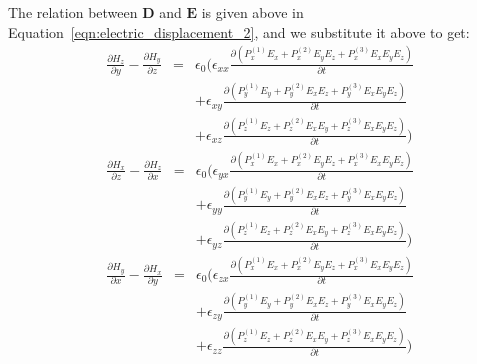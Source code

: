 \documentclass{article}[12pt]
\theoremstyle{plain}
\begin{document}
The relation between $\mathbf{D}$ and $\mathbf{E}$ is given above in
Equation~\ref{eqn:electric_displacement_2}, and we substitute it above to get:
\begin{eqnarray}
\frac{\partial H_z}{\partial y} - \frac{\partial H_y}{\partial z} & = & \epsilon_0 \Big( \epsilon_{xx} \frac{\partial (P^{(1)}_xE_x+P^{(2)}_xE_yE_z+P^{(3)}_xE_xE_yE_z)}{\partial t}  \nonumber \\
& & + \epsilon_{xy} \frac{\partial (P^{(1)}_yE_y+P^{(2)}_yE_xE_z+P^{(3)}_yE_xE_yE_z)}{\partial t}  \nonumber \\
& & + \epsilon_{xz} \frac{\partial (P^{(1)}_zE_z+P^{(2)}_zE_xE_y+P^{(3)}_zE_xE_yE_z)}{\partial t}  \Big) 
\end{eqnarray}
\begin{eqnarray}
\frac{\partial H_x}{\partial z} - \frac{\partial H_z}{\partial x} & = & \epsilon_0 \Big( \epsilon_{yx} \frac{\partial (P^{(1)}_xE_x+P^{(2)}_xE_yE_z+P^{(3)}_xE_xE_yE_z)}{\partial t}  \nonumber \\
& & + \epsilon_{yy} \frac{\partial (P^{(1)}_yE_y+P^{(2)}_yE_xE_z+P^{(3)}_yE_xE_yE_z)}{\partial t}  \nonumber \\
& & + \epsilon_{yz} \frac{\partial (P^{(1)}_zE_z+P^{(2)}_zE_xE_y+P^{(3)}_zE_xE_yE_z)}{\partial t}  \Big) 
\end{eqnarray}
\begin{eqnarray}
\frac{\partial H_y}{\partial x} - \frac{\partial H_x}{\partial y} & = & \epsilon_0 \Big( \epsilon_{zx} \frac{\partial (P^{(1)}_xE_x+P^{(2)}_xE_yE_z+P^{(3)}_xE_xE_yE_z)}{\partial t}  \nonumber \\
& & + \epsilon_{zy} \frac{\partial (P^{(1)}_yE_y+P^{(2)}_yE_xE_z+P^{(3)}_yE_xE_yE_z)}{\partial t}  \nonumber \\
& & + \epsilon_{zz} \frac{\partial (P^{(1)}_zE_z+P^{(2)}_zE_xE_y+P^{(3)}_zE_xE_yE_z)}{\partial t}  \Big)
\end{eqnarray}
\end{document}
